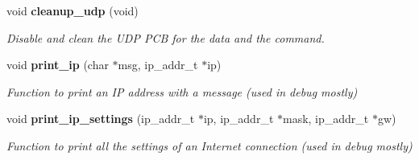 \begin{DoxyCompactItemize}
void \textbf{ cleanup\+\_\+udp} (void)
\begin{DoxyCompactList}\small\item\em Disable and clean the U\+DP P\+CB for the data and the command. \end{DoxyCompactList}\item 
void \textbf{ print\+\_\+ip} (char $\ast$msg, ip\+\_\+addr\+\_\+t $\ast$ip)
\begin{DoxyCompactList}\small\item\em Function to print an IP address with a message (used in debug mostly) \end{DoxyCompactList}\item 
void \textbf{ print\+\_\+ip\+\_\+settings} (ip\+\_\+addr\+\_\+t $\ast$ip, ip\+\_\+addr\+\_\+t $\ast$mask, ip\+\_\+addr\+\_\+t $\ast$gw)
\begin{DoxyCompactList}\small\item\em Function to print all the settings of an Internet connection (used in debug mostly) \end{DoxyCompactList}\end{DoxyCompactItemize}
